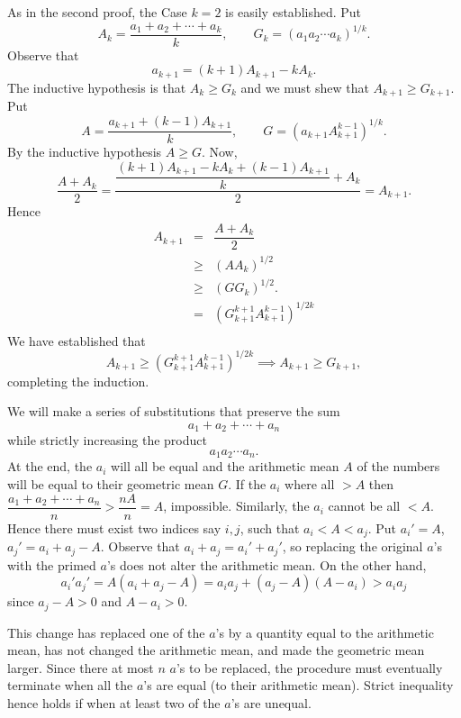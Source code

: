 \documentclass[11pt, openany]{book}
\theoremstyle{change} \theoremheaderfont{\blue\sffamily\bfseries}
\newcommand{\proofsymbol}{\Pisymbol{pzd}{113}}
\theoremstyle{nonumberplain} \theoremheaderfont{\sffamily\bfseries}
\newenvironment{t-pf}[0]{\itshape\begin{quote}{\bf Third Proof: \ }}{\proofsymbol\end{quote}}
\newenvironment{fo-pf}[0]{\itshape\begin{quote}{\bf Fourth Proof: \ }}{\proofsymbol\end{quote}}
\newcommand{\í}{\'{\i}}
\begin{document}
\begin{t-pf}
As in the second proof, the Case $k=2$ is easily established. Put $$
A_k = \dfrac{a_1+a_2+\cdots + a_k}{k}, \qquad G_k =
\left(a_1a_2\cdots a_k\right)^{1/k}.$$Observe that
$$ a_{k+1} = (k+1)A_{k+1}-kA_k. $$
The inductive hypothesis is that $A_k \geq G_k$ and we must shew
that $A_{k+1}\geq G_{k+1}$. Put
$$A= \dfrac{a_{k+1}+(k-1)A_{k+1}}{k}, \qquad G=\left(a_{k+1}A_{k+1} ^{k-1}\right)^{1/k}.
$$By the inductive hypothesis $A \geq G$.
Now, $$ \dfrac{A+A_k}{2} =
\dfrac{\dfrac{(k+1)A_{k+1}-kA_k+(k-1)A_{k+1}}{k}+A_k}{2}=A_{k+1}.
$$Hence
$$\begin{array}{lll} A_{k+1} & = & \dfrac{A+A_k}{2}\\
& \geq & \left(AA_k\right)^{1/2} \\
& \geq & \left(GG_k\right)^{1/2}. \\
& = & \left(G_{k+1} ^{k+1}A_{k+1} ^{k-1}\right)^{1/2k}\\
\end{array}$$ We have established that $$A_{k+1} \geq \left(G_{k+1} ^{k+1}A_{k+1} ^{k-1}\right)^{1/2k}\implies A_{k+1}\geq G_{k+1},
$$completing the induction.
\end{t-pf}
\begin{fo-pf}
We will make a series of substitutions that preserve the sum
$$a_1+a_2+\cdots +a_n$$while strictly increasing the product $$a_1a_2\cdots a_n. $$ At the
end, the $a_i$ will all be equal and the arithmetic mean $A$ of the
numbers will be equal to their geometric mean $G$. If the $a_i$
where all $>A$ then $\dfrac{a_1+a_2+\cdots
+a_n}{n}>\dfrac{nA}{n}=A$, impossible. Similarly, the $a_i$ cannot
be all $<A$. Hence there must exist two indices say $i, j$, such
that $a_i < A < a_j$. Put $a_i '=A$, $a_j'=a_i+a_j-A$. Observe that
$a_i+a_j=a_i'+a_j'$, so replacing the original $a$'s with the primed
$a$'s does not alter the arithmetic mean. On the other hand,
$$
 a_i'a_j'=   A\left(a_i + a_j - A\right) = a_ia_j + \left(a_j - A\right)\left(A - a_i\right) > a_ia_j
$$since $a_{j}-A>0$ and $A-a_i>0$.

\bigskip
This change has replaced one of the $a$'s by a quantity equal to the
arithmetic mean, has not changed the arithmetic mean, and made the
geometric mean larger. Since there at most $n$ $a$'s to be replaced,
the procedure must eventually terminate when all the $a$'s are equal
(to their arithmetic mean). Strict inequality hence holds if when at
least two of the $a$'s are unequal.
\end{fo-pf}
\end{document}
